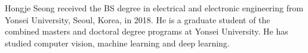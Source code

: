 \documentclass[journal,comsoc]{IEEEtran}
\begin{document}



















































































































\begin{IEEEbiography}{Hongje Seong} received the BS degree in electrical and electronic engineering from Yonsei University, Seoul, Korea, in 2018. He is a graduate student of the combined masters and doctoral degree programs at Yonsei University. He has studied computer vision, machine learning and deep learning.
\end{IEEEbiography}
\end{document}
